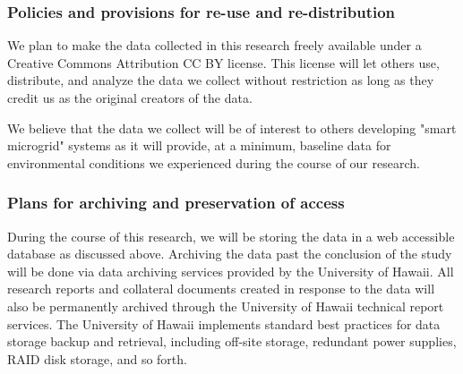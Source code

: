 \documentclass{proposalnsf}
\begin{document}
\subsubsection*{Policies and provisions for re-use and re-distribution}

We plan to make the data collected in this research freely available under
a Creative Commons Attribution CC BY license.  This license will let others
use, distribute, and analyze the data we collect without restriction as
long as they credit us as the original creators of the data.

We believe that the data we collect will be of interest to others
developing "smart microgrid" systems as it will provide, at a
minimum, baseline data for environmental conditions we experienced during
the course of our research.

\subsubsection*{Plans for archiving and preservation of access}

During the course of this research, we will be storing the data in a web
accessible database as discussed above.  Archiving the data past the
conclusion of the study will be done via data archiving services provided
by the University of Hawaii.  All research reports and collateral documents
created in response to the data will also be permanently archived through
the University of Hawaii technical report services.  The University of
Hawaii implements standard best practices for data storage backup and
retrieval, including off-site storage, redundant power supplies, RAID disk
storage, and so forth.
\end{document}
